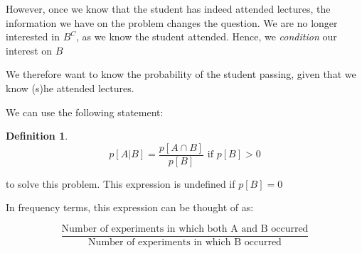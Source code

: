 \documentclass[12pt]{extbook}
\newtheorem{df}{Definition}[section]
\begin{document}

However, once we know that the student has indeed attended lectures, the information we have on the problem changes the question.   We are no longer interested in $B^C$, as we know the student attended.   Hence, we {\color{green}\emph{condition}} our interest on $B$


We therefore want to know the probability of the student passing, given that we know (s)he attended lectures.



We can use the following statement:

\begin{df}
\begin{displaymath}
p[A|B] = \frac{p[A \cap B] }{p[B]} \mbox{ if } p[B] > 0
\end{displaymath}
\end{df}
to solve this problem.   This expression is undefined if $p[B] = 0$

 

In frequency terms, this expression can be thought of as:

\begin{displaymath}
\frac{\mbox{Number of experiments in which both A and B occurred}}{\mbox{Number of experiments in which B occurred}}
\end{displaymath}



 


 




\end{document}
